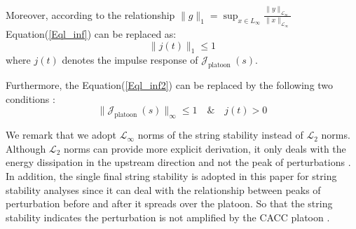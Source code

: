 \documentclass[journal]{IEEEtran}
\begin{document}
Moreover, according to the relationship $\|g\|_{1}=\sup _{x \in L_{\infty}} \frac{\|y\|_{\mathcal{L}_{\infty}}}{\|x\|_{\mathcal{L}_{\infty}}}$ Equation(\ref{Eql_inf}) can be replaced as:
\begin{equation}
  \|j\left(t\right)\|_{1}\leq 1
  \label{Eql_inf2}
\end{equation}
where $j\left(t\right)$ denotes the impulse response of $\mathcal{J}_{\text {platoon }}(s)$.

Furthermore, the Equation(\ref{Eql_inf2}) can be replaced by the following two conditions \citep{Swaroop1994}:
\begin{equation}
  \|\mathcal{J}_{\text {platoon }}(s)\|_{\infty} \leq 1 \quad \& \quad j\left(t\right)>0
  \label{Eql_inf3}
\end{equation}

We remark that we adopt $\mathcal{L}_{\infty}$ norms of the string stability instead of $\mathcal{L}_{2}$ norms. Although $\mathcal{L}_{2}$ norms can provide more explicit derivation, it only deals with the energy dissipation in the upstream direction and not the peak of perturbations \citep{Darbha2003}. In addition, the single final string stability is adopted in this paper for string stability analyses since it can deal with the relationship between peaks of perturbation before and after it spreads over the platoon. So that the string stability indicates the perturbation is not amplified by the CACC platoon \citep{Studli2017}.

\end{document}
